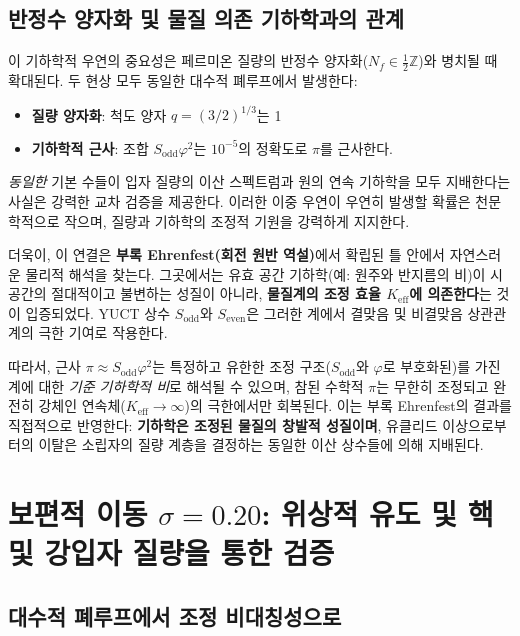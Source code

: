 \documentclass[11pt,a4paper]{article}
\theoremstyle{remark}
\begin{document}
	\subsection{반정수 양자화 및 물질 의존 기하학과의 관계}
	
	이 기하학적 우연의 중요성은 페르미온 질량의 반정수 양자화(\(N_f \in \frac{1}{2}\mathbb{Z}\))와 병치될 때 확대된다. 두 현상 모두 동일한 대수적 폐루프에서 발생한다:
	\begin{itemize}
		\item \textbf{질량 양자화}: 척도 양자 \(q = (3/2)^{1/3}\)는 1%
		\item \textbf{기하학적 근사}: 조합 \(S_{\mathrm{odd}}\varphi^2\)는 \(10^{-5}\)의 정확도로 \(\pi\)를 근사한다.
	\end{itemize}
	\emph{동일한} 기본 수들이 입자 질량의 이산 스펙트럼과 원의 연속 기하학을 모두 지배한다는 사실은 강력한 교차 검증을 제공한다. 이러한 이중 우연이 우연히 발생할 확률은 천문학적으로 작으며, 질량과 기하학의 조정적 기원을 강력하게 지지한다.
	
	더욱이, 이 연결은 \textbf{부록 Ehrenfest(회전 원반 역설)}에서 확립된 틀 안에서 자연스러운 물리적 해석을 찾는다. 그곳에서는 유효 공간 기하학(예: 원주와 반지름의 비)이 시공간의 절대적이고 불변하는 성질이 아니라, \textbf{물질계의 조정 효율 \(K_{\mathrm{eff}}\)에 의존한다}는 것이 입증되었다. YUCT 상수 \(S_{\mathrm{odd}}\)와 \(S_{\mathrm{even}}\)은 그러한 계에서 결맞음 및 비결맞음 상관관계의 극한 기여로 작용한다.
	
	따라서, 근사 \(\pi \approx S_{\mathrm{odd}}\varphi^2\)는 특정하고 유한한 조정 구조(\(S_{\mathrm{odd}}\)와 \(\varphi\)로 부호화된)를 가진 계에 대한 \emph{기준 기하학적 비}로 해석될 수 있으며, 참된 수학적 \(\pi\)는 무한히 조정되고 완전히 강체인 연속체(\(K_{\mathrm{eff}} \to \infty\))의 극한에서만 회복된다. 이는 부록 Ehrenfest의 결과를 직접적으로 반영한다: \textbf{기하학은 조정된 물질의 창발적 성질이며}, 유클리드 이상으로부터의 이탈은 소립자의 질량 계층을 결정하는 동일한 이산 상수들에 의해 지배된다.
	
	\section{보편적 이동 \(\sigma = 0.20\): 위상적 유도 및 핵 및 강입자 질량을 통한 검증}
	\label{sec:sigma}
	
	\subsection{대수적 폐루프에서 조정 비대칭성으로}
	
\end{document}
